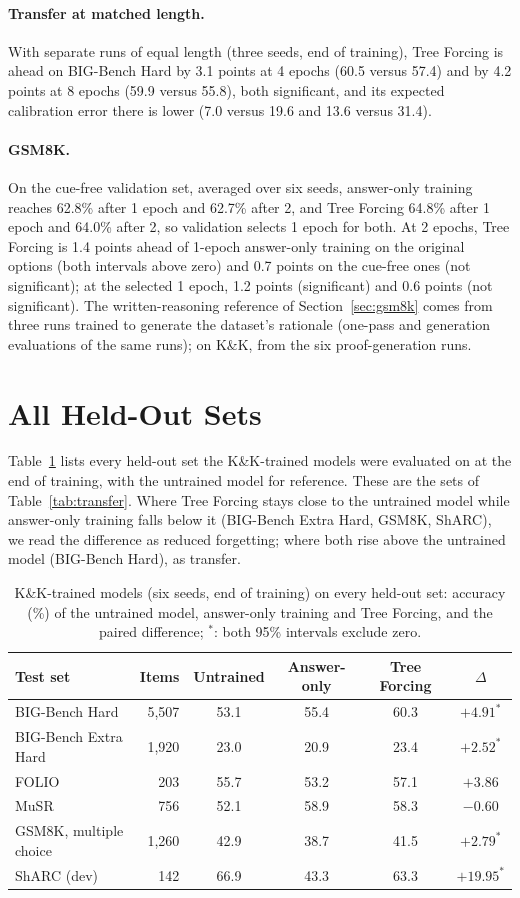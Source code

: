 \documentclass[10pt]{article}
\newcommand{\tf}{Tree Forcing}
\begin{document}
\paragraph{Transfer at matched length.} With separate runs of equal length (three seeds, end of training), \tf{} is
ahead on BIG-Bench Hard by 3.1 points at 4 epochs (60.5 versus 57.4) and by 4.2 points at 8 epochs (59.9 versus 55.8),
both significant, and its expected calibration error there is lower (7.0 versus 19.6 and 13.6 versus 31.4).
\paragraph{GSM8K.} On the cue-free validation set, averaged over six seeds, answer-only training reaches 62.8\% after 1
epoch and 62.7\% after 2, and \tf{} 64.8\% after 1 epoch and 64.0\% after 2, so validation selects 1 epoch for both.
At 2 epochs, \tf{} is 1.4 points ahead of 1-epoch answer-only training on the original options
(both intervals above zero) and 0.7 points on the cue-free ones (not significant); at the selected 1 epoch, 1.2
points (significant) and 0.6 points (not significant). The written-reasoning reference of Section~\ref{sec:gsm8k} comes from three runs trained to generate the dataset's
rationale (one-pass and generation evaluations of the same runs); on K\&K, from the six proof-generation runs.

\section{All Held-Out Sets}
\label{app:heldout}
Table~\ref{tab:heldout} lists every held-out set the K\&K-trained models were evaluated on at the end of training, with
the untrained model for reference. These are the sets of Table~\ref{tab:transfer}. Where \tf{} stays close to the untrained
model while answer-only training falls below it (BIG-Bench Extra Hard, GSM8K, ShARC), we read the difference as
reduced forgetting; where both rise above the untrained model (BIG-Bench Hard), as transfer.

\begin{table}[h]
\centering
\small
\caption{K\&K-trained models (six seeds, end of training) on every held-out set: accuracy (\%) of the untrained model,
answer-only training and \tf{}, and the paired difference; $^\ast$: both 95\% intervals exclude zero.}
\label{tab:heldout}
\begin{tabular}{lrcccc}
\toprule
Test set & Items & Untrained & Answer-only & \tf{} & $\Delta$ \\
\midrule
BIG-Bench Hard & 5,507 & 53.1 & 55.4 & 60.3 & $+4.91^\ast$ \\
BIG-Bench Extra Hard & 1,920 & 23.0 & 20.9 & 23.4 & $+2.52^\ast$ \\
FOLIO & 203 & 55.7 & 53.2 & 57.1 & $+3.86$ \\
MuSR & 756 & 52.1 & 58.9 & 58.3 & $-0.60$ \\
GSM8K, multiple choice & 1,260 & 42.9 & 38.7 & 41.5 & $+2.79^\ast$ \\
ShARC (dev) & 142 & 66.9 & 43.3 & 63.3 & $+19.95^\ast$ \\
\midrule
\bottomrule
\end{tabular}
\end{table}
\end{document}
